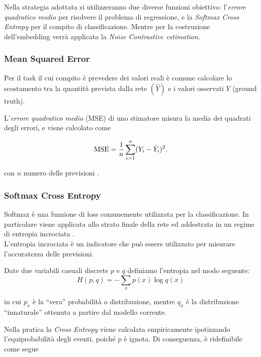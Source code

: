 Nella strategia adottata si utilizzeranno due diverse funzioni obiettivo: l'\emph{errore quadratico medio} per risolvere il problema di regressione, e la \emph{Softmax Cross Entropy} per il compito di classificazione. Mentre per la costruzione dell'embedding verrà applicata la \emph{Noise Contrastive estimation}.

\subsubsection{Mean Squared Error}
\label{subsubsec:MSE}

Per il task il cui compito è prevedere dei valori reali è comune calcolare lo scostamento tra la quantità prevista dalla rete $(\hat{Y})$ e i valori osservati $Y$ (ground truth). 
 
L'\emph{errore quadratico medio} (MSE) di uno stimatore misura la media dei quadrati degli errori, e viene calcolato come

\begin{equation}
\operatorname{MSE} = \frac{1}{n}\sum_{i=1}^{n}(Y_i-\hat{Y}_i)^2 \mbox{.}
\end{equation}

con $n$ numero delle previsioni \cite{wang2009mean}.

\subsubsection{Softmax Cross Entropy}
\label{subsubsec:sce}

Softmax è una funzione di loss comunemente utilizzata per la classificazione. In particolare viene applicata allo strato finale della rete ed addestrata in un regime di entropia incrociata \cite{tang2013deep}.\\
L'entropia incrociata è un indicatore che può essere utilizzato per misurare l'accuratezza delle previsioni. 

Date due variabili casuali discrete $p$ e $q$ definiamo l'entropia nel modo seguente:
\begin{equation}
	H(p,q)=-\sum_{x} p(x) \log q(x)
\end{equation}

in cui $p_{x}$ è la ``vera'' probabilità o distribuzione, mentre $q_{x}$ è la distribuzione ``innaturale'' ottenuta a partire dal modello corrente.

Nella pratica la \emph{Cross Entropy} viene calcolata empiricamente ipotizzando l'equiprobabilità degli eventi, poiché $p$ è ignota. 
Di conseguenza, è ridefinibile come segue

